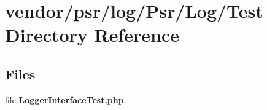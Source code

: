 \section{vendor/psr/log/\+Psr/\+Log/\+Test Directory Reference}
\label{dir_51da61791408f0e67dc21e77df8914b5}
\subsection*{Files}
\begin{DoxyCompactItemize}
\item 
file {\bf Logger\+Interface\+Test.\+php}
\end{DoxyCompactItemize}
